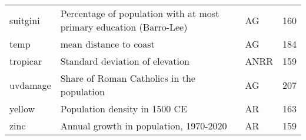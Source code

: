 \begin{tabular}{lllr}
suitgini                       &       Percentage of population with at most primary education (Barro-Lee) &     AG &   160 \\
temp                           &                                                    mean distance to coast &     AG &   184 \\
tropicar                       &                                           Standard deviation of elevation &   ANRR &   159 \\
uvdamage                       &                                Share of Roman Catholics in the population &     AG &   207 \\
yellow                         &                                             Population density in 1500 CE &     AR &   163 \\
zinc                           &                                    Annual growth in population, 1970-2020 &     AR &   159 \\
\bottomrule
\end{tabular}
